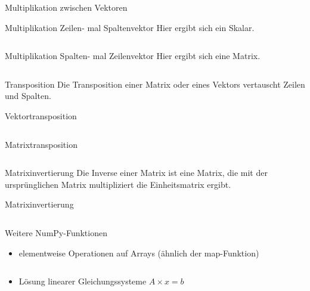 \documentclass[xelatex,aspectratio=169]{beamer}
\begin{document}
\begin{frame}{Multiplikation zwischen Vektoren}
    \begin{block}{Multiplikation Zeilen- mal Spaltenvektor}
        Hier ergibt sich ein Skalar.
        \inputminted[firstline=3, lastline=6]{python}{src/numpy_arrays_multiply_vectors.py}
    \end{block}
    \begin{block}{Multiplikation Spalten- mal Zeilenvektor}
        Hier ergibt sich eine Matrix.
        \inputminted[firstline=3, lastline=6]{python}{src/numpy_arrays_multiply_vectors.py}
    \end{block}
\end{frame}

\begin{frame}{Transposition}
    Die Transposition einer Matrix oder eines Vektors vertauscht Zeilen und Spalten.
    \begin{block}{Vektortransposition}
        \inputminted[firstline=3]{python}{src/numpy_vector_transpose.py}
    \end{block}
    \begin{block}{Matrixtransposition}
        \inputminted[firstline=3]{python}{src/numpy_matrix_transpose.py}
    \end{block}

\end{frame}

\begin{frame}{Matrixinvertierung}
    Die Inverse einer Matrix ist eine Matrix, die mit der ursprünglichen Matrix multipliziert die Einheitsmatrix ergibt.

    \small
    \begin{block}{Matrixinvertierung}
        \inputminted[firstline=3]{python}{src/numpy_matrix_invert.py}
    \end{block}

\end{frame}

\begin{frame}{Weitere NumPy-Funktionen}
    \begin{itemize}
        \item elementweise Operationen auf Arrays (ähnlich der map-Funktion)
              \inputminted[firstline=3]{python}{src/numpy_element_wise.py}

        \item Lösung linearer Gleichungssysteme \(A \times x = b\)
              \inputminted[firstline=3,lastline=6]{python}{src/numpy_solve.py}
    \end{itemize}

\end{frame}
\end{document}

